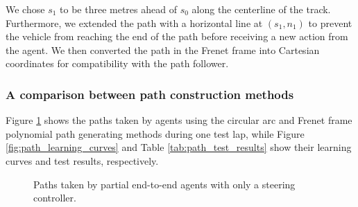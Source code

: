 %     

We chose $s_1$ to be three metres ahead of $s_0$ along the centerline of the track.
Furthermore, we extended the path with a horizontal line at $(s_1,n_1)$ to prevent the vehicle from reaching the end of the path before receiving a new action from the agent.
We then converted the path in the Frenet frame into Cartesian coordinates for compatibility with the path follower.

%     

\subsubsection{A comparison between path construction methods}\label{sec:path_comparison}

Figure \ref{fig:path_method_comparison} shows the paths taken by agents using the circular arc and Frenet frame polynomial path generating methods during one test lap, while Figure \ref{fig:path_learning_curves} and Table \ref{tab:path_test_results} show their learning curves and test results, respectively.

\begin{figure}[htb!]
    \centering
    
    \caption[Paths taken by the partial end-to-end agents with only steering control]{Paths taken by partial end-to-end agents with only a steering controller.}
    \label{fig:path_method_comparison}
\end{figure}

